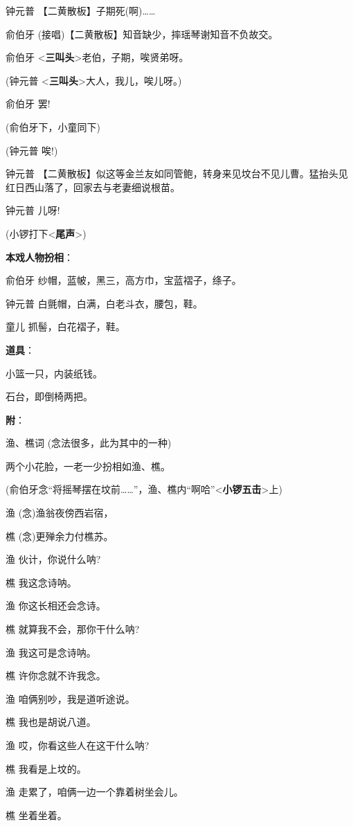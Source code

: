 钟元普 【二黄散板】子期死(啊)\ldots{}\ldots{}

俞伯牙 (接唱)【二黄散板】知音缺少，摔瑶琴谢知音不负故交。

俞伯牙 \textless{}\textbf{三叫头}\textgreater{}老伯，子期，唉贤弟呀。

(钟元普 \textless{}\textbf{三叫头}\textgreater{}大人，我儿，唉儿呀。)

俞伯牙 罢!

(俞伯牙下，小童同下)

(钟元普 唉!)

钟元普
【二黄散板】似这等金兰友如同管鲍，转身来见坟台不见儿曹。猛抬头见红日西山落了，回家去与老妻细说根苗。

钟元普 儿呀!

(小锣打下\textless{}\textbf{尾声}\textgreater{})

\textbf{本戏人物扮相}：

俞伯牙 纱帽，蓝帔，黑三，高方巾，宝蓝褶子，绦子。

钟元普 白氈帽，白满，白老斗衣，腰包，鞋。

童儿 抓髻，白花褶子，鞋。

\textbf{道具}：

小篮一只，内装纸钱。

石台，即倒椅两把。

\textbf{附}：

渔、樵词 (念法很多，此为其中的一种)

两个小花脸，一老一少扮相如渔、樵。

(俞伯牙念``将摇琴摆在坟前\ldots{}\ldots{}''，渔、樵内``啊哈''\textless{}\textbf{小锣五击}\textgreater{}上)

渔 (念)渔翁夜傍西岩宿，

樵 (念)更殚余力付樵苏。

渔 伙计，你说什么呐?

樵 我这念诗呐。

渔 你这长相还会念诗。

樵 就算我不会，那你干什么呐?

渔 我这可是念诗呐。

樵 许你念就不许我念。

渔 咱俩别吵，我是道听途说。

樵 我也是胡说八道。

渔 哎，你看这些人在这干什么呐?

樵 我看是上坟的。

渔 走累了，咱俩一边一个靠着树坐会儿。

樵 坐着坐着。

